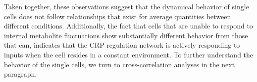 %
%


Taken together, these observations suggest that the dynamical behavior of single cells
does not follow relationships that exist for average quantities between different conditions. 
Additionally, the fact that \dcamp cells that are unable to respond to internal metabolite fluctuations show substantially different behavior from those that can, indicates that the CRP regulation network is actively responding to inputs when the cell resides in a constant environment.
%
To further understand the 
behavior of the single cells, 
we turn to cross-correlation analyses in the next paragraph.

